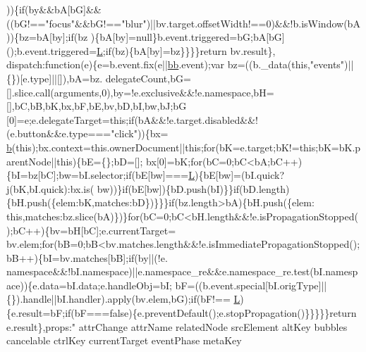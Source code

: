 \begin{DoxyCode}
      ))\{\textcolor{keywordflow}{if}(by&&bA[bG]&&((bG!==\textcolor{stringliteral}{"focus"}&&bG!==\textcolor{stringliteral}{"blur"})||bv.target.offsetWidth!==0)&&!b.isWindow(bA))\{bz=bA[by];\textcolor{keywordflow}{if}(bz
      )\{bA[by]=null\}b.event.triggered=bG;bA[bG]();b.event.triggered=\hyperlink{jquery_8js_a38ee4c0b5f4fe2a18d0c783af540d253}{L};\textcolor{keywordflow}{if}(bz)\{bA[by]=bz\}\}\}\}\textcolor{keywordflow}{return} bv.result\},
      dispatch:\textcolor{keyword}{function}(e)\{e=b.event.fix(e||\hyperlink{jquery_8js_a1d6558865876e1c8cca029fce41a4bdb}{bb}.event);var bz=((b.\_data(\textcolor{keyword}{this},\textcolor{stringliteral}{"events"})||\{\})[e.type]||[]),bA=bz.
      delegateCount,bG=[].slice.call(arguments,0),by=!e.exclusive&&!e.namespace,bH=[],bC,bB,bK,bx,bF,bE,bv,bD,bI,bw,bJ;bG
      [0]=e;e.delegateTarget=\textcolor{keyword}{this};\textcolor{keywordflow}{if}(bA&&!e.target.disabled&&!(e.button&&e.type===\textcolor{stringliteral}{"click"}))\{bx=
      \hyperlink{jquery_8js_aa4026ad5544b958e54ce5e106fa1c805}{b}(\textcolor{keyword}{this});bx.context=this.ownerDocument||\textcolor{keyword}{this};\textcolor{keywordflow}{for}(bK=e.target;bK!=\textcolor{keyword}{this};bK=bK.parentNode||\textcolor{keyword}{this})\{bE=\{\};bD=[];
      bx[0]=bK;\textcolor{keywordflow}{for}(bC=0;bC<bA;bC++)\{bI=bz[bC];bw=bI.selector;\textcolor{keywordflow}{if}(bE[bw]===\hyperlink{jquery_8js_a38ee4c0b5f4fe2a18d0c783af540d253}{L})\{bE[bw]=(bI.quick?j(bK,bI.quick):bx.is(
      bw))\}\textcolor{keywordflow}{if}(bE[bw])\{bD.push(bI)\}\}\textcolor{keywordflow}{if}(bD.length)\{bH.push(\{elem:bK,matches:bD\})\}\}\}\textcolor{keywordflow}{if}(bz.length>bA)\{bH.push(\{elem:\textcolor{keyword}{
      this},matches:bz.slice(bA)\})\}\textcolor{keywordflow}{for}(bC=0;bC<bH.length&&!e.isPropagationStopped();bC++)\{bv=bH[bC];e.currentTarget=
      bv.elem;\textcolor{keywordflow}{for}(bB=0;bB<bv.matches.length&&!e.isImmediatePropagationStopped();bB++)\{bI=bv.matches[bB];\textcolor{keywordflow}{if}(by||(!e.
      namespace&&!bI.namespace)||e.namespace\_re&&e.namespace\_re.test(bI.namespace))\{e.data=bI.data;e.handleObj=bI;
      bF=((b.event.special[bI.origType]||\{\}).handle||bI.handler).apply(bv.elem,bG);\textcolor{keywordflow}{if}(bF!==
      \hyperlink{jquery_8js_a38ee4c0b5f4fe2a18d0c783af540d253}{L})\{e.result=bF;\textcolor{keywordflow}{if}(bF===\textcolor{keyword}{false})\{e.preventDefault();e.stopPropagation()\}\}\}\}\}\textcolor{keywordflow}{return} e.result\},props:\textcolor{stringliteral}{"
      attrChange attrName relatedNode srcElement altKey bubbles cancelable ctrlKey currentTarget eventPhase metaKey
}
\end{DoxyCode}
